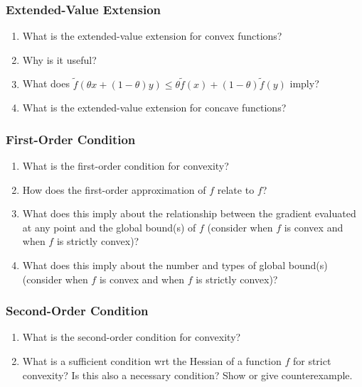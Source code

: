 \documentclass[]{article}
\newcounter{q}
\begin{document}
\subsubsection*{Extended-Value Extension}
\begin{enumerate}[resume*]
\item What is the extended-value extension for convex functions?
\item Why is it useful?
\item What does $\tilde{f}(\theta x + (1-\theta) y) \leq \theta \tilde{f}(x) + (1-\theta)\tilde{f}(y)$ imply? 
\item What is the extended-value extension for concave functions?
\end{enumerate}

\subsubsection*{First-Order Condition}
\begin{enumerate}[resume*]
\item What is the first-order condition for convexity?
\item How does the first-order approximation of $f$ relate to $f$?
\item What does this imply about the relationship between the gradient evaluated at any point and the global bound(s) of $f$ (consider when $f$ is convex and when $f$ is strictly convex)?
\item What does this imply about the number and types of global bound(s) (consider when $f$ is convex and when $f$ is strictly convex)?
\end{enumerate}

\subsubsection*{Second-Order Condition}
\begin{enumerate}[resume*]
\item What is the second-order condition for convexity?
\item What is a sufficient condition wrt the Hessian of a function $f$ for strict convexity? Is this also a necessary condition? Show or give counterexample.
\end{enumerate}
\end{document}
